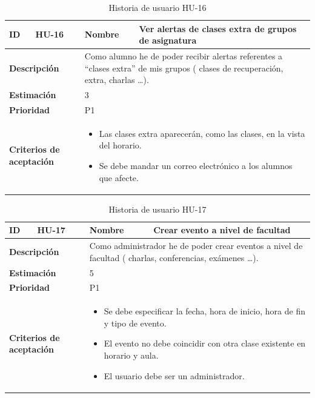 \begin{table}[H]
    \centering
    \begin{tabular}{|p{2cm}|p{4cm}|p{2cm}|p{4cm}|}
        \hline
        \textbf{ID} & HU-16 & \textbf{Nombre} & Ver alertas de clases extra de grupos de asignatura \\
        \hline
        \multicolumn{2}{|p{6cm}|}{\textbf{Descripción}} & \multicolumn{2}{p{6cm}|}{Como alumno he de poder recibir alertas referentes a “clases extra” de mis grupos ( clases de recuperación, extra, charlas …).} \\
        \hline
        \multicolumn{2}{|p{6cm}|}{\textbf{Estimación}} & \multicolumn{2}{p{6cm}|}{3} \\
        \hline
        \multicolumn{2}{|p{6cm}|}{\textbf{Prioridad}} & \multicolumn{2}{p{6cm}|}{P1} \\
        \hline
        \multicolumn{2}{|p{6cm}|}{\textbf{Criterios de aceptación}} & \multicolumn{2}{p{6cm}|}{
            \begin{itemize}
                \item Las clases extra aparecerán, como las clases, en la vista del horario.
                \item Se debe mandar un correo electrónico a los alumnos que afecte.
            \end{itemize}
        } \\
        \hline
    \end{tabular}
    \caption{Historia de usuario HU-16}
    \label{tab:hu_16}
\end{table}

\begin{table}[H]
    \centering
    \begin{tabular}{|p{2cm}|p{4cm}|p{2cm}|p{4cm}|}
        \hline
        \textbf{ID} & HU-17 & \textbf{Nombre} & Crear evento a nivel de facultad \\
        \hline
        \multicolumn{2}{|p{6cm}|}{\textbf{Descripción}} & \multicolumn{2}{p{6cm}|}{Como administrador he de poder crear eventos a nivel de facultad ( charlas, conferencias, exámenes …).} \\
        \hline
        \multicolumn{2}{|p{6cm}|}{\textbf{Estimación}} & \multicolumn{2}{p{6cm}|}{5} \\
        \hline
        \multicolumn{2}{|p{6cm}|}{\textbf{Prioridad}} & \multicolumn{2}{p{6cm}|}{P1} \\
        \hline
        \multicolumn{2}{|p{6cm}|}{\textbf{Criterios de aceptación}} & \multicolumn{2}{p{6cm}|}{
            \begin{itemize}
                \item Se debe especificar la fecha, hora de inicio, hora de fin y tipo de evento.
                \item El evento no debe coincidir con otra clase existente en horario y aula.
                \item El usuario debe ser un administrador.
            \end{itemize}
        } \\
        \hline
    \end{tabular}
    \caption{Historia de usuario HU-17}
    \label{tab:hu_17}
\end{table}

